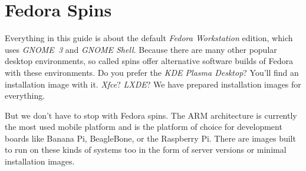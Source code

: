 \section*{Fedora Spins}

Everything in this guide is about the default \emph{Fedora Workstation} edition, which uses \emph{GNOME~3} and \emph{GNOME Shell}. Because there are many other popular desktop environments, so called spins offer alternative software builds of Fedora with these environments. Do you prefer the \emph{KDE Plasma Desktop}? You'll find an installation image with it. \emph{Xfce}? \emph{LXDE}? We have prepared installation images for everything.

But we don't have to stop with Fedora spins. The ARM architecture is currently the most used mobile platform and is the platform of choice for development boards like Banana Pi, BeagleBone, or the Raspberry Pi. There are images built to run on these kinds of systems too in the form of server versions or minimal installation images.
\endinput
